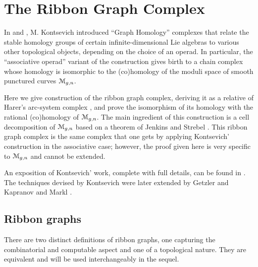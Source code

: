 

\chapter{The Ribbon Graph Complex}
\label{cha:ribbon-graph-complex}

In \cite{kontsevich;feynman} and \cite{kontsevich;1993}, M. Kontsevich
introduced ``Graph Homology'' complexes that relate the stable
homology groups of certain infinite-dimensional Lie algebras to
various other topological objects, depending on the choice of an
operad.  In particular, the ``associative operad'' variant of the
construction gives birth to a chain complex whose homology is
isomorphic to the (co)homology of the moduli space of smooth punctured
curves $\mathcal{M}_{g,n}$.

Here we give construction of the ribbon graph complex, deriving it as
a relative of Harer's arc-system complex
\cite{harer;cohomological-dimension,
  harer;cohomology-of-moduli}, and prove the
isomorphism of its homology with the rational (co)homology of
$\mathcal{M}_{g,n}$.  The main ingredient of this construction is a cell
decomposition of $\mathcal{M}_{g,n}$ based on a theorem of Jenkins and Strebel
\cite{strebel;quadratic-differentials;1983}.  This ribbon graph
complex is the same complex that one gets by applying Kontsevich'
construction in the associative case; however, the proof given here is
very specific to $\mathcal{M}_{g,n}$ and cannot be extended.

An exposition of Kontsevich' work, complete with full details, can be
found in \cite{conant-vogtmann;2003}.  The techniques devised by
Kontsevich were later extended by Getzler and Kapranov
\cite{getzler-kapranov} and Markl \cite{markl;cyclic}.



\section{Ribbon graphs}
\label{sec:ribbon-graphs}

There are two distinct definitions of ribbon graphs, one capturing the
combinatorial and computable aspect and one of a topological nature.
They are equivalent and will be used interchangeably in the sequel.

